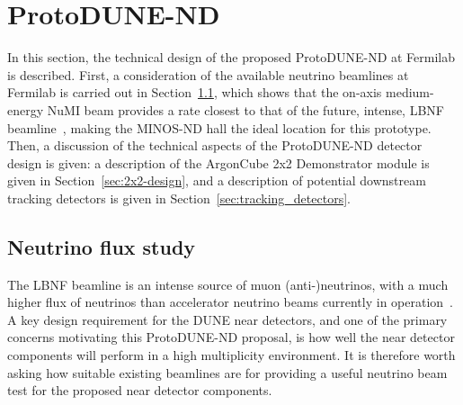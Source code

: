 \section{ProtoDUNE-ND}
\label{sec:protodune-nd}
In this section, the technical design of the proposed ProtoDUNE-ND at Fermilab is described. First, a consideration of the available neutrino beamlines at Fermilab is carried out in Section~\ref{sec:neutrino-flux}, which shows that the on-axis medium-energy NuMI beam provides a rate closest to that of the future, intense, LBNF beamline~\cite{DUNE3, dune_opt_flux}, making the MINOS-ND hall the ideal location for this prototype. %
Then, a discussion of the technical aspects of the ProtoDUNE-ND detector design is given: a description of the ArgonCube 2x2 Demonstrator module is given in Section~\ref{sec:2x2-design}, and a description of potential downstream tracking detectors is given in Section~\ref{sec:tracking_detectors}. %

\subsection{Neutrino flux study}
\label{sec:neutrino-flux}
The LBNF beamline is an intense source of muon (anti-)neutrinos, with a much higher flux of neutrinos than accelerator neutrino beams currently in operation~\cite{DUNE3,dune_opt_flux}. A key design requirement for the DUNE near detectors, and one of the primary concerns motivating this ProtoDUNE-ND proposal, is how well the near detector components will perform in a high multiplicity environment. It is therefore worth asking how suitable existing beamlines are for providing a useful neutrino beam test for the proposed near detector components.

